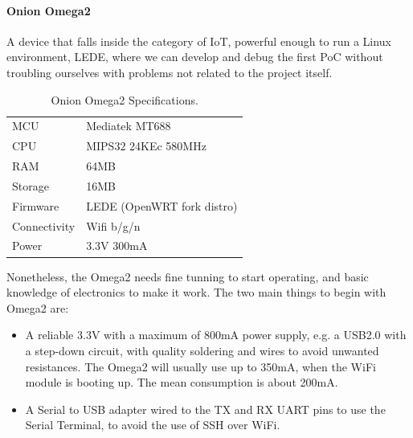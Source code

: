 \paragraph{Onion Omega2} A device that falls inside the category of IoT, powerful enough to run a Linux environment, LEDE, where we can develop and debug the first PoC without troubling ourselves with problems not related to the project itself.


\begin{table}[h]
	\myfloatalign
	\begin{tabularx}{0.75\textwidth}{ll} \toprule
		MCU & Mediatek MT688 \citep{MT7688} \\
		CPU & MIPS32 24KEc 580MHz \\
		RAM & 64MB \\
		Storage & 16MB \\
		Firmware & LEDE (OpenWRT fork distro) \\
		Connectivity & Wifi b/g/n \\
		Power & 3.3V 300mA \\
		\bottomrule
	\end{tabularx}
	\caption[Onion Omega 2 Specifications]{Onion Omega2 Specifications.}
	\label{tab:Omega2Specs}
\end{table}



Nonetheless, the Omega2 needs fine tunning to start operating, and basic knowledge of electronics to make it work. The two main things to begin with Omega2 are:
\begin{itemize}
	\item A reliable 3.3V with a maximum of 800mA power supply, e.g. a USB2.0 with a step-down circuit, with quality soldering and wires to avoid unwanted resistances. The Omega2 will usually use up to 350mA, when the WiFi module is booting up. The mean consumption is about 200mA.
	\item A Serial to USB adapter wired to the TX and RX UART pins to use the Serial Terminal, to avoid the use of SSH over WiFi.
\end{itemize}


